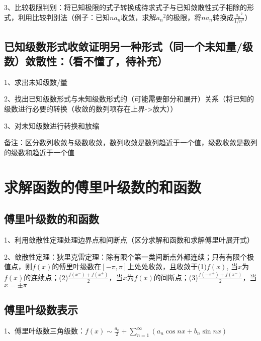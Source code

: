 3、比较极限判别：将已知极限的式子转换成待求式子与已知敛散性式子相除的形式，利用比较判别法（例子：已知$ na_n $收敛，求解$ {a_n}^2 $的极限，将$ na_n $转换成$ \frac{{a_n}^2}{ 1/n^2 } $）



\subsection{已知级数形式收敛证明另一种形式（同一个未知量/级数）敛散性：（看不懂了，待补充）}

1、求出未知级数/量

2、找出已知级数形式与未知级数形式的（可能需要部分和展开）关系（将已知的级数进行必要的转换（收敛的数列项存在上界->放大））

3、对未知级数进行转换和放缩



备注：区分数列收敛与级数收敛，数列收敛是数列趋近于一个值，级数收敛是数列的级数和趋近于一个值

\section{求解函数的傅里叶级数的和函数}



\subsection{傅里叶级数的和函数}

1、利用敛散性定理处理边界点和间断点（区分求解和函数和求解傅里叶展开式）

2、敛散性定理：狄里克雷定理：除有限个第一类间断点外都连续；只有有限个极值点，则$ f(x) $的傅里叶级数在$ [-\pi, \pi] $上处处收敛，且收敛于(1)$ f(x) $, 当$ x $为$ f(x) $的连续点；(2)$  \frac{f\left(x^{-}\right)+f\left(x^{+}\right)}{2} $，当$ x $为$ f(x) $的间断点；(3)$ \frac{f\left(-\pi^{+}\right)+f\left(\pi^{-}\right)}{2} $，当$ x=\pm \pi $



\subsection{傅里叶级数表示}

1、傅里叶级数三角级数：$ f(x) \sim \frac{a_{0}}{2}+\sum_{n=1}^{\infty}\left(a_{n} \cos n x+b_{n} \sin n x\right) $

